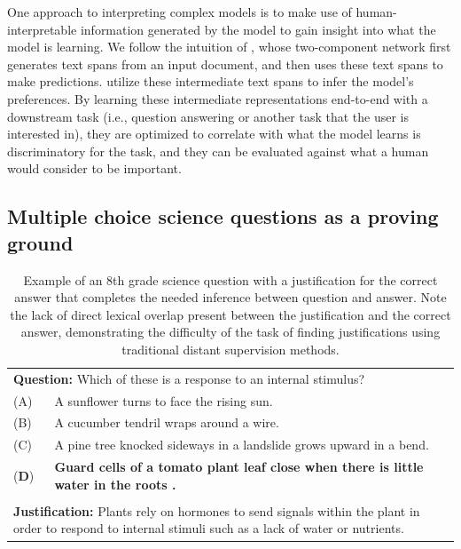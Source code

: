 One approach to interpreting complex models is to make use of human-interpretable information generated by the model to gain insight into what the model is learning.  
We follow the intuition of \citet{Lei2016RationalizingNP}, whose two-component network first generates text spans from an input document, and then uses these text spans to make predictions.   \citeauthor{Lei2016RationalizingNP} utilize these intermediate text spans to infer the model's preferences.
By learning these intermediate representations end-to-end with a downstream task (i.e., question answering or another task that the user is interested in), they are optimized to correlate with what the model learns is discriminatory for the task, and they can be evaluated against what a human would consider to be important.  

\subsection{Multiple choice science questions as a proving ground}
\label{sec:mcqa}

\begin{table}[t]
\begin{center}
\begin{tabularx}{\linewidth}{p{1cm}p{13cm}}
\multicolumn{2}{p{15cm}}{\textbf{Question:} Which of these is a response to an internal stimulus?} \\
 (A) & A sunflower turns to face the rising sun. \\
 (B) & A cucumber tendril wraps around a wire. \\
 (C) &  A pine tree knocked sideways in a landslide grows upward in a bend. \\
 (\textbf{D}) &\textbf{Guard cells of a tomato plant leaf close when there is little water in the roots .} \\
\\
\multicolumn{2}{p{15cm}}{\textbf{Justification:} 
Plants rely on hormones to send signals within the plant in order to respond to internal stimuli such as a lack of water or nutrients. } \\
\end{tabularx}

\caption{{  Example of an 8th grade science question with a justification for the correct answer that completes the needed inference between question and answer.  Note the lack of direct lexical overlap present between the justification and the correct answer, demonstrating the difficulty of the task of finding justifications using traditional distant supervision methods. }}

\label{tab:question_example}
\end{center}
\end{table}


